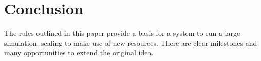 \section{Conclusion}

The rules outlined in this paper provide a basis for a system to run a large simulation, scaling to make use of new resources. There are clear milestones and many opportunities to extend the original idea.